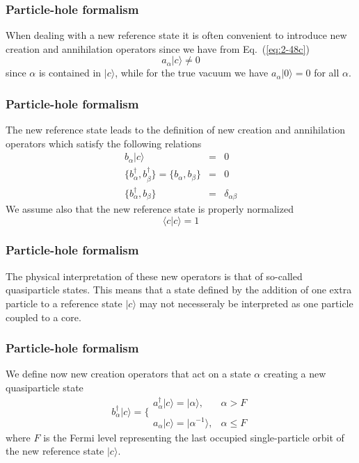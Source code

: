 \documentclass[compress]{beamer}
\newcommand*{\ket}[1]{|#1\rangle}
\begin{document}
\frame
{
  \frametitle{Particle-hole formalism}
\begin{small}
{\scriptsize
When dealing with a new reference state it is often convenient to introduce 
new creation and annihilation operators since we have 
from Eq.~(\ref{eq:2-48c})
\begin{equation}
	a_\alpha \ket{c} \neq 0 \label{eq:2-49}
\end{equation}
since  $\alpha$ is contained  in $\ket{c}$, while for the true vacuum we have 
$a_\alpha \ket{0} = 0$ for all $\alpha$.
}
\end{small}
}


\frame
{
  \frametitle{Particle-hole formalism}
\begin{small}
{\scriptsize
The new reference state leads to the definition of new creation and annihilation operators
which satisfy the following relations
\begin{eqnarray}
	b_\alpha \ket{c} &=& 0 \label{eq:2-50a} \\
	\{b_\alpha^\dagger , b_\beta^\dagger \} = \{b_\alpha , b_\beta \} &=& 0 \nonumber  \\
	\{b_\alpha^\dagger , b_\beta \} &=& \delta_{\alpha \beta} \label{eq:2-50c}
\end{eqnarray}
We assume also that the new reference state is properly normalized
\begin{equation}
	\langle c | c \rangle = 1 \label{eq:2-51}
\end{equation}
}
\end{small}
}


\frame
{
  \frametitle{Particle-hole formalism}
\begin{small}
{\scriptsize
The physical interpretation of these new operators is that of so-called quasiparticle states.
This means that a state defined by the addition of one extra particle to a reference state 
$\ket{c}$ may not necesseraly be interpreted as one particle coupled to a core.
}
\end{small}
}


\frame
{
  \frametitle{Particle-hole formalism}
\begin{small}
{\scriptsize
We define now new creation operators that act on a state $\alpha$ creating a new quasiparticle state
\begin{equation}
	b_\alpha^\dagger\ket{c} = \Bigg\{ \begin{array}{ll}
		a_\alpha^\dagger \ket{c} = \ket{\alpha}, & \alpha > F \\
		\\
		a_\alpha \ket{c} = \ket{\alpha^{-1}}, & \alpha \leq F
	\end{array} \label{eq:2-52}
\end{equation}
where $F$ is the Fermi level representing the last  occupied single-particle orbit 
of the new reference state $\ket{c}$. 
}
\end{small}
}
\end{document}
